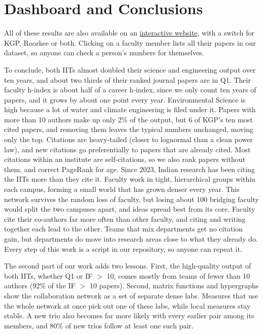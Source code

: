 \documentclass[conference,10pt]{IEEEtran}
\begin{document}
\section{Dashboard and Conclusions}
All of these results are also available on an
\href{https://avi1o1.github.io/DPCN_A2_ResearchMapper/}{interactive website}, with a switch for KGP, Roorkee or both. Clicking on
a faculty member lists all their papers in our dataset, so anyone can check a person's numbers for themselves.

To conclude, both IITs almost doubled their science and engineering output over ten years, and about two thirds of
their ranked journal papers are in Q1. Their faculty h-index is about half of a career h-index, since we only count ten
years of papers, and it grows by about one point every year. Environmental Science is high because a lot of water and
climate engineering is filed under it. Papers with more than 10 authors make up only 2\% of the output, but 6 of KGP's
ten most cited papers, and removing them leaves the typical numbers unchanged, moving only the top. Citations are
heavy-tailed (closer to lognormal than a clean power law), and new citations go preferentially to papers that are
already cited. Most citations within an institute are self-citations, so we also rank papers without them, and correct
PageRank for age. Since 2023, Indian research has been citing the IITs more than they cite it. Faculty work in tight,
hierarchical groups within each campus, forming a small world that has grown denser every year. This network survives
the random loss of faculty, but losing about 100 bridging faculty would split the two campuses apart, and ideas spread
best from its core. Faculty cite their co-authors far more often than other faculty, and citing and writing together
each lead to the other. Teams that mix departments get no citation gain, but departments do move into research areas
close to what they already do. Every step of this work is a script in our repository, so anyone can repeat it.

The second part of our work adds two lessons. First, the high-quality output of both IITs, whether Q1 or IF $>$ 10,
comes mostly from teams of fewer than 10 authors (92\% of the IF $>$ 10 papers). Second, matrix functions and hypergraphs show the
collaboration network as a set of separate dense labs. Measures that use the whole network at once pick out one of
these labs, while local measures stay stable. A new trio also becomes far more likely with every earlier pair among
its members, and 80\% of new trios follow at least one such pair.
\end{document}
